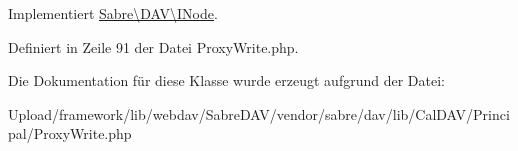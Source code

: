 Implementiert \mbox{\hyperlink{interface_sabre_1_1_d_a_v_1_1_i_node_ac90fa5526e98def2e1f51bc57a772366}{Sabre\textbackslash{}\+D\+A\+V\textbackslash{}\+I\+Node}}.



Definiert in Zeile 91 der Datei Proxy\+Write.\+php.



Die Dokumentation für diese Klasse wurde erzeugt aufgrund der Datei\+:\begin{DoxyCompactItemize}
\item 
Upload/framework/lib/webdav/\+Sabre\+D\+A\+V/vendor/sabre/dav/lib/\+Cal\+D\+A\+V/\+Principal/Proxy\+Write.\+php\end{DoxyCompactItemize}
